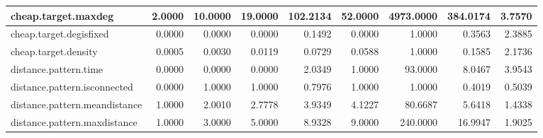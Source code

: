 \begin{table}[H]
{\begin{tabular}{|l|r|r|r|r|r|r|r|r|}
		cheap.target.maxdeg                     & 2.0000                            & 10.0000                               & 19.0000                           & 102.2134                           & 52.0000                               & 4973.0000                         & 384.0174                         & 3.7570                                   \\ \hline
		cheap.target.degisfixed                 & 0.0000                            & 0.0000                                & 0.0000                            & 0.1492                             & 0.0000                                & 1.0000                            & 0.3563                           & 2.3885                                   \\ \hline
		cheap.target.density                    & 0.0005                            & 0.0030                                & 0.0119                            & 0.0729                             & 0.0588                                & 1.0000                            & 0.1585                           & 2.1736                                   \\ \hline
		distance.pattern.time                   & 0.0000                            & 0.0000                                & 0.0000                            & 2.0349                             & 1.0000                                & 93.0000                           & 8.0467                           & 3.9543                                   \\ \hline
		distance.pattern.isconnected            & 0.0000                            & 1.0000                                & 1.0000                            & 0.7976                             & 1.0000                                & 1.0000                            & 0.4019                           & 0.5039                                   \\ \hline
		distance.pattern.meandistance           & 1.0000                            & 2.0010                                & 2.7778                            & 3.9349                             & 4.1227                                & 80.6687                           & 5.6418                           & 1.4338                                   \\ \hline
		distance.pattern.maxdistance            & 1.0000                            & 3.0000                                & 5.0000                            & 8.9328                             & 9.0000                                & 240.0000                          & 16.9947                          & 1.9025                                   \\ \hline

\end{tabular}}
\end{table}
